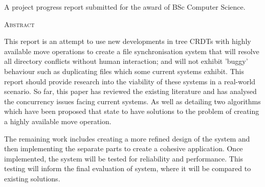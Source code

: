 \documentclass[12pt]{article}
\begin{document}
\begin{titlepage}


    \vfill\vfill\vfill\vfill %

    A project progress report submitted for the award of BSc Computer Science.





    \vfill %

\end{titlepage}


\newpage
\begin{center}
    \textsc{\large Abstract}
\end{center}

This report is an attempt to use new developments in tree CRDTs with highly available move operations to create a file synchronisation system that will resolve all directory conflicts without human interaction; and will not exhibit 'buggy' behaviour such as duplicating files which some current systems exhibit. This report should provide research into the viability of these systems in a real-world scenario. So far, this paper has reviewed the existing literature and has analysed the concurrency issues facing current systems. As well as detailing two algorithms which have been proposed that state to have solutions to the problem of creating a highly available move operation. \par
The remaining work includes creating a more refined design of the system and then implementing the separate parts to create a cohesive application. Once implemented, the system will be tested for reliability and performance. This testing will inform the final evaluation of system, where it will be compared to existing solutions.
\end{document}
